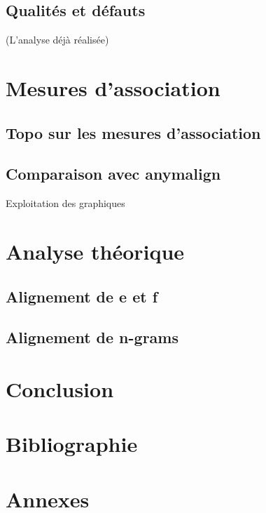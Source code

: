 \documentclass[a4paper,10pt]{article}
\begin{document}

\subsection{Qualités et défauts}
(L'analyse déjà réalisée)


\section{Mesures d'association}

\subsection{Topo sur les mesures d'association}

\subsection{Comparaison avec anymalign}
Exploitation des graphiques


\section{Analyse théorique}

\subsection{Alignement de e et f}

\subsection{Alignement de n-grams}


\section{Conclusion}


\section{Bibliographie}




\section{Annexes}
\end{document}
